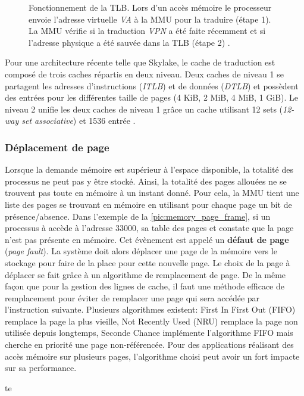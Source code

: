 \begin{figure}
\begin{subfigure}[t]{0.48\linewidth}
        \label{pic_memory_page_table_tlb_miss}
    \end{subfigure}
    \caption{Fonctionnement de la TLB. Lors d'un accès mémoire le processeur envoie l'adresse virtuelle \textit{VA} à la MMU pour la traduire (étape 1). La MMU vérifie si la traduction \textit{VPN} a été faite récemment et si l'adresse physique a été sauvée dans la TLB (étape 2) \cite{Mowry2012}.
    \label{pic_memory_page_table_tlb}}
\end{figure}




Pour une architecture récente telle que Skylake, le cache de traduction est composé de trois caches répartis en deux niveau. Deux caches de niveau 1 se partagent les adresses d'instructions (\textit{ITLB}) et de données (\textit{DTLB}) et possèdent des entrées pour les différentes taille de pages (4 KiB, 2 MiB, 4 MiB, 1 GiB). Le niveau 2 unifie les deux caches de niveau 1 grâce un cache utilisant 12 sets  (\textit{12-way set associative}) et 1536 entrée \cite{Wikichipb}.




\subsubsection{Déplacement de page} \label{sec:deplacement_page}
Lorsque la demande mémoire est supérieur à l'espace disponible, la totalité des processus ne peut pas y être stocké. Ainsi, la totalité des pages allouées ne se trouvent pas toute en mémoire à un instant donné. Pour cela, la MMU tient une liste des pages se trouvant en mémoire en utilisant pour chaque page un bit de présence/absence. Dans l'exemple de la \autoref{pic:memory_page_frame}, si un processus à accède à l'adresse $33000$, sa table des pages et constate que la page n'est pas présente en mémoire. Cet évènement est appelé un \textbf{défaut de page} (\textit{page fault}). La système doit alors déplacer une page de la mémoire vers le stockage pour faire de la place pour cette nouvelle page. Le choix de la page à déplacer se fait grâce à un algorithme de remplacement de page. De la même façon que pour la gestion des lignes de cache, il faut une méthode efficace de remplacement pour éviter de remplacer une page qui sera accédée par l'instruction suivante. Plusieurs algorithmes existent: First In First Out (FIFO) remplace la page la plus vieille, Not Recently Used (NRU) remplace la page non utilisée depuis longtemps, Seconde Chance implémente l'algorithme FIFO mais cherche en priorité une page non-référencée. Pour des applications réalisant des accès mémoire sur plusieurs pages, l'algorithme choisi peut avoir un fort impacte sur sa performance.



te